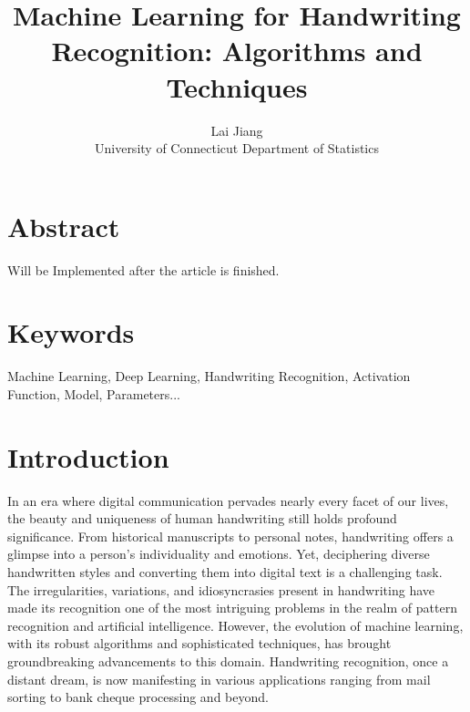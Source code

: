 \documentclass[12pt]{article}
\title{Machine Learning for Handwriting Recognition: Algorithms and Techniques}
\author{Lai Jiang\\
  University of Connecticut Department of Statistics
}
\begin{document}
\maketitle

\section* {Abstract}
Will be Implemented after the article is finished.

\section* {Keywords}
Machine Learning, Deep Learning, Handwriting Recognition, Activation Function, Model, Parameters...

\section* {Introduction}
In an era where digital communication pervades nearly every facet of our lives, the beauty and uniqueness of human handwriting still holds profound significance. From historical manuscripts to personal notes, handwriting offers a glimpse into a person's individuality and emotions. Yet, deciphering diverse handwritten styles and converting them into digital text is a challenging task. The irregularities, variations, and idiosyncrasies present in handwriting have made its recognition one of the most intriguing problems in the realm of pattern recognition and artificial intelligence. However, the evolution of machine learning, with its robust algorithms and sophisticated techniques, has brought groundbreaking advancements to this domain. Handwriting recognition, once a distant dream, is now manifesting in various applications ranging from mail sorting to bank cheque processing and beyond. 
\end{document}
